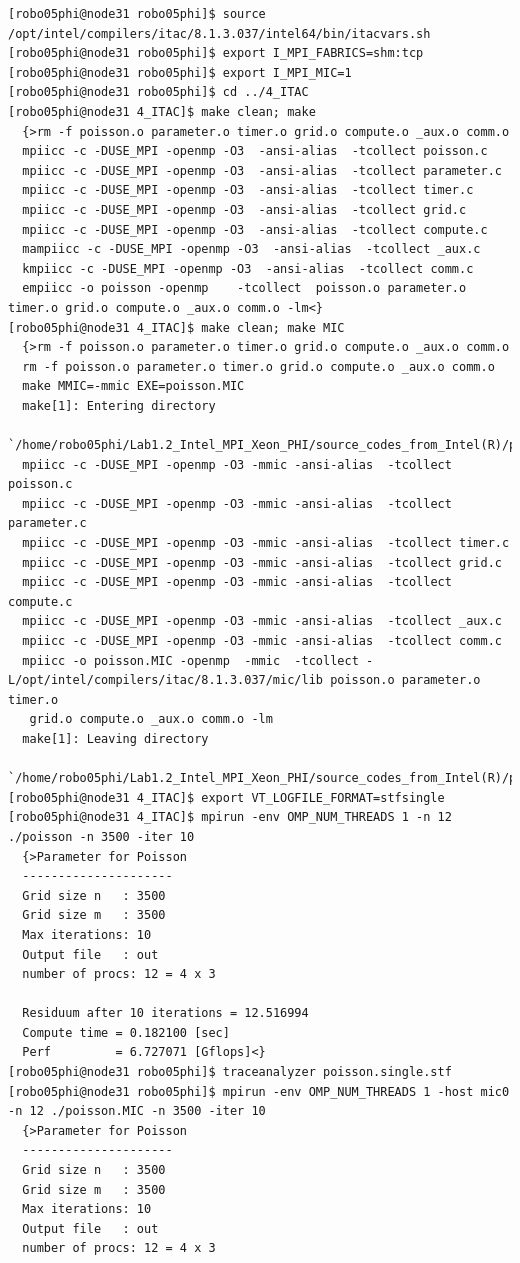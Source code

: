\documentclass[pscyr,10pt]{hedlab}
\begin{document}
\begin{lstlisting}
[robo05phi@node31 robo05phi]$ source /opt/intel/compilers/itac/8.1.3.037/intel64/bin/itacvars.sh
[robo05phi@node31 robo05phi]$ export I_MPI_FABRICS=shm:tcp
[robo05phi@node31 robo05phi]$ export I_MPI_MIC=1
[robo05phi@node31 robo05phi]$ cd ../4_ITAC
[robo05phi@node31 4_ITAC]$ make clean; make
  {>rm -f poisson.o parameter.o timer.o grid.o compute.o _aux.o comm.o
  mpiicc -c -DUSE_MPI -openmp -O3  -ansi-alias  -tcollect poisson.c
  mpiicc -c -DUSE_MPI -openmp -O3  -ansi-alias  -tcollect parameter.c
  mpiicc -c -DUSE_MPI -openmp -O3  -ansi-alias  -tcollect timer.c
  mpiicc -c -DUSE_MPI -openmp -O3  -ansi-alias  -tcollect grid.c
  mpiicc -c -DUSE_MPI -openmp -O3  -ansi-alias  -tcollect compute.c
  mampiicc -c -DUSE_MPI -openmp -O3  -ansi-alias  -tcollect _aux.c
  kmpiicc -c -DUSE_MPI -openmp -O3  -ansi-alias  -tcollect comm.c
  empiicc -o poisson -openmp    -tcollect  poisson.o parameter.o timer.o grid.o compute.o _aux.o comm.o -lm<}
[robo05phi@node31 4_ITAC]$ make clean; make MIC
  {>rm -f poisson.o parameter.o timer.o grid.o compute.o _aux.o comm.o
  rm -f poisson.o parameter.o timer.o grid.o compute.o _aux.o comm.o
  make MMIC=-mmic EXE=poisson.MIC
  make[1]: Entering directory
   `/home/robo05phi/Lab1.2_Intel_MPI_Xeon_PHI/source_codes_from_Intel(R)/part3/intel_mpi_lab_C/4_ITAC'
  mpiicc -c -DUSE_MPI -openmp -O3 -mmic -ansi-alias  -tcollect poisson.c
  mpiicc -c -DUSE_MPI -openmp -O3 -mmic -ansi-alias  -tcollect parameter.c
  mpiicc -c -DUSE_MPI -openmp -O3 -mmic -ansi-alias  -tcollect timer.c
  mpiicc -c -DUSE_MPI -openmp -O3 -mmic -ansi-alias  -tcollect grid.c
  mpiicc -c -DUSE_MPI -openmp -O3 -mmic -ansi-alias  -tcollect compute.c
  mpiicc -c -DUSE_MPI -openmp -O3 -mmic -ansi-alias  -tcollect _aux.c
  mpiicc -c -DUSE_MPI -openmp -O3 -mmic -ansi-alias  -tcollect comm.c
  mpiicc -o poisson.MIC -openmp  -mmic  -tcollect -L/opt/intel/compilers/itac/8.1.3.037/mic/lib poisson.o parameter.o timer.o
   grid.o compute.o _aux.o comm.o -lm
  make[1]: Leaving directory
   `/home/robo05phi/Lab1.2_Intel_MPI_Xeon_PHI/source_codes_from_Intel(R)/part3/intel_mpi_lab_C/4_ITAC'<}
[robo05phi@node31 4_ITAC]$ export VT_LOGFILE_FORMAT=stfsingle 
[robo05phi@node31 4_ITAC]$ mpirun -env OMP_NUM_THREADS 1 -n 12 ./poisson -n 3500 -iter 10
  {>Parameter for Poisson
  ---------------------
  Grid size n   : 3500
  Grid size m   : 3500
  Max iterations: 10
  Output file   : out
  number of procs: 12 = 4 x 3
  
  Residuum after 10 iterations = 12.516994 
  Compute time = 0.182100 [sec]
  Perf         = 6.727071 [Gflops]<}
[robo05phi@node31 robo05phi]$ traceanalyzer poisson.single.stf 
[robo05phi@node31 robo05phi]$ mpirun -env OMP_NUM_THREADS 1 -host mic0 -n 12 ./poisson.MIC -n 3500 -iter 10
  {>Parameter for Poisson
  ---------------------
  Grid size n   : 3500
  Grid size m   : 3500
  Max iterations: 10
  Output file   : out
  number of procs: 12 = 4 x 3
  

\end{lstlisting}
\end{document}
